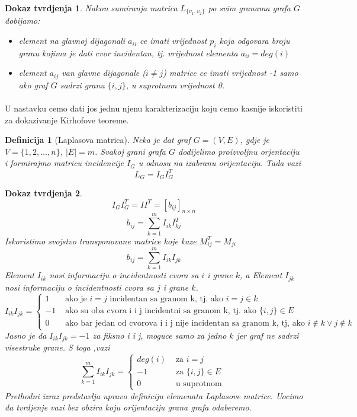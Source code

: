 \documentclass[11pt]{article}
\newtheorem{definition}{Definicija}
\newtheorem*{custom_proof}{Dokaz tvrdjenja}
\begin{document}
			\begin{custom_proof}
			Nakon sumiranja matrica $L_{\{v_1,v_2\}}$ po svim granama grafa $G$ dobijamo:
				\begin{itemize}
				\item element na glavnoj dijagonali $a_{ii}$ ce imati vrijednost $p_i$ koja odgovara broju granu kojima je dati cvor incidentan, tj. vrijednost elementa $a_{ii} = deg(i)$
				\item element $a_{ij}$ van glavne dijagonale ($i \neq j$) matrice ce imati vrijednost -1 samo ako graf $G$ sadrzi granu $\{i,j\}$, u suprotnom vrijednost 0.  
				\end{itemize}
			\end{custom_proof}
		
			\paragraph{}
			U nastavku cemo dati jos jednu njenu karakterizaciju koju cemo kasnije iskoristiti za dokazivanje Kirhofove teoreme.
	
			\begin{definition}[Laplasova matrica] 
			Neka je dat graf $G = (V, E)$, gdje je $V = \{1, 2, \dots, n\}$, $|E| = m$. Svakoj grani grafa $G$ dodijelimo proizvoljnu orjentaciju i formirajmo matricu incidencije $I_G$ u odnosu na izabranu orijentaciju.
			Tada vazi
			 \[
				 L_G = I_G I_G^T
			 \]
			\end{definition}
	
			\begin{custom_proof}
			\[
				I_G I_G^T = I  I^T  = [b_{ij}]_{n \times n}
			\]
			\[
				 b_{ij} = \sum_{k=1}^{m} I_{ik} I_{kj}^T
			 \]
			Iskoristimo svojstvo transponovane matrice koje kaze $M_{ij}^T = M_{ji}$
			\[
				 b_{ij} = \sum_{k=1}^{m} I_{ik} I_{jk}
			 \]
			Element $I_{ik}$ nosi informaciju o incidentnosti cvora sa $i$ i grane $k$, a Element $I_{jk}$ nosi informaciju o incidentnosti cvora sa $j$ i grane $k$.
			\[
				 I_{ik}I_{jk} =
				 \begin{cases}
				1  & \text{ ako je } i = j \text{ incidentan sa granom k, tj. ako }  i = j \in k \\
				 -1  & \text{ ako su oba cvora i i j incidentni sa granom k, tj. ako } \{i,j\} \in E \\
				 0 & \text{ ako bar jedan od cvorova i i j nije incidentan sa granom k, tj, ako } i \notin k \lor j\notin k 
				 \end{cases}
			 \]
			Jasno je da $I_{ik}I_{jk} = -1$ za fiksno i i j, moguce samo za jedno $k$ jer graf ne sadrzi visestruke grane. S toga ,vazi
			\[
				\sum_{k=1}^{m} I_{ik}I_{jk} =
				 \begin{cases}
				deg(i)  & \text{ za } i = j \\
				 -1  & \text{ za } \{i,j\} \in E \\
				 0 & \text{ u suprotnom }
				 \end{cases}
			 \]
			Prethodni izraz predstavlja upravo definiciju elemenata Laplasove matrice. Uocimo da tvrdjenje vazi bez obzira koju orijentaciju grana grafa odaberemo.
			\end{custom_proof}
	
\end{document}
